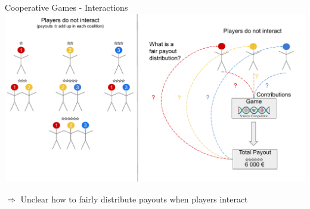 \documentclass[11pt,compress,t,notes=noshow, aspectratio=169, xcolor=table]{beamer}
\begin{document}



\begin{frame}{Cooperative Games - Interactions}
\includegraphics[page=3, width = \textwidth]{figure/Shapley.pdf}

\centering 
$\Rightarrow$ Unclear how to fairly distribute payouts when players interact
\end{frame}
\end{document}
